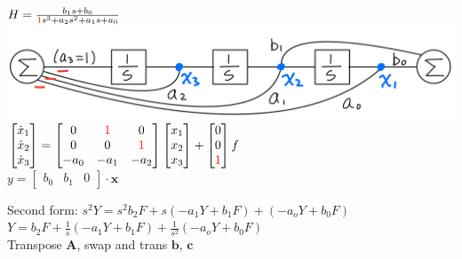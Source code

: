 \documentclass[4pt]{article}
\theoremstyle{definition}
\theoremstyle{definition}
\newcommand{\red}[1]{\textcolor{red}{#1}}
\begin{document}
\begin{landscape}
\begin{multicols}{3}
    \(H = \frac{b_1s+b_0}{\red{1}s^3+a_2s^2+a_1s+a_0}\)\\     
    \includegraphics[width=\linewidth]{figures/canonical.png}
    \(
    \begin{bmatrix}
        \dot{x}_1\\
        \dot{x}_2\\
        \dot{x}_3\\
    \end{bmatrix}
    =
    \begin{bmatrix}
        0 & \red 1 & 0\\
        0 & 0 & \red 1\\
        -a_0 & -a_1 & -a_2
    \end{bmatrix}
    \begin{bmatrix}
        x_1\\
        x_2\\
        x_3
    \end{bmatrix}
    +
    \begin{bmatrix}
        0\\0\\\red{1}        %
    \end{bmatrix}
    f
    \)\\

    \(y =
    \begin{bmatrix}
        b_0 & b_1 & 0      %
    \end{bmatrix}
    \cdot \mathbf x
    \)

    Second form: \(s^2 Y = s^2 b_2 F + s(-a_1 Y + b_1 F) + (-a_o Y + b_0 F)\)\\
        \hspace{1em} \(Y = b_2 F + \frac 1 s(-a_1 Y + b_1 F) + \frac 1 {s^2}(-a_o Y + b_0 F)\)\\
    Transpose $\mathbf A$, swap and trans $\mathbf b$, $\mathbf c$


\end{multicols}
\end{landscape}
\end{document}
